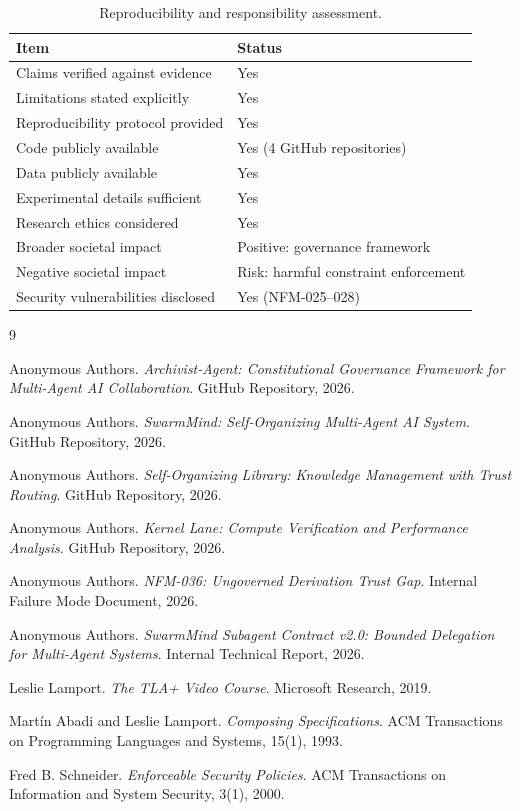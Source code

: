 \documentclass[11pt,letterpaper]{article}
\begin{document}
\begin{table}[h]
\centering
\caption{Reproducibility and responsibility assessment.}
\label{tab:reproducibility}
\begin{tabular}{ll}
\toprule
\textbf{Item} & \textbf{Status} \\
\midrule
Claims verified against evidence & Yes \\
Limitations stated explicitly & Yes \\
Reproducibility protocol provided & Yes \\
Code publicly available & Yes (4 GitHub repositories) \\
Data publicly available & Yes \\
Experimental details sufficient & Yes \\
Research ethics considered & Yes \\
Broader societal impact & Positive: governance framework \\
Negative societal impact & Risk: harmful constraint enforcement \\
Security vulnerabilities disclosed & Yes (NFM-025--028) \\
\bottomrule
\end{tabular}
\end{table}


\begin{thebibliography}{9}

Anonymous Authors.
\textit{Archivist-Agent: Constitutional Governance Framework for Multi-Agent AI Collaboration}.
GitHub Repository, 2026.

Anonymous Authors.
\textit{SwarmMind: Self-Organizing Multi-Agent AI System}.
GitHub Repository, 2026.

Anonymous Authors.
\textit{Self-Organizing Library: Knowledge Management with Trust Routing}.
GitHub Repository, 2026.

Anonymous Authors.
\textit{Kernel Lane: Compute Verification and Performance Analysis}.
GitHub Repository, 2026.

Anonymous Authors.
\textit{NFM-036: Ungoverned Derivation Trust Gap}.
Internal Failure Mode Document, 2026.

Anonymous Authors.
\textit{SwarmMind Subagent Contract v2.0: Bounded Delegation for Multi-Agent Systems}.
Internal Technical Report, 2026.

Leslie Lamport.
\textit{The TLA+ Video Course}.
Microsoft Research, 2019.

Mart\'in Abadi and Leslie Lamport.
\textit{Composing Specifications}.
ACM Transactions on Programming Languages and Systems, 15(1), 1993.

Fred B. Schneider.
\textit{Enforceable Security Policies}.
ACM Transactions on Information and System Security, 3(1), 2000.

\end{thebibliography}
\end{document}
